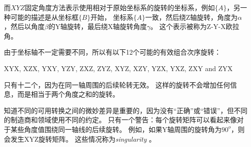
而$ XYZ $固定角度方法表示使用相对于原始坐标系的旋转的坐标系，例如$ \{A \} $，另一种可能的描述是从坐标框$ \{B \} $开始， 坐标系$ \{A \} $一致，然后绕Z轴旋转，角度为$ \alpha $，然后以角度$ \beta $的Y轴旋转，最后绕X轴旋转角度$ \gamma $。 这个表示被称为Z-Y-X欧拉角。


由于坐标轴不一定需要不同，所以有以下12个可能的有效组合次序旋转：

\begin{center}
XYX, XZX, YXY, YZY, ZXZ, ZYZ, XYZ, XZY, YZX, YXZ, ZXY and ZYX
\end{center}

只有十二个，因为在同一轴周围的后续轮转无效。 这样的旋转不会增加任何信息，而是相当于两个角度之和的旋转。


知道不同的可用转换之间的微妙差异是重要的，因为没有“正确”或“错误”，但不同的制造商和领域使用不同的约定。 只有一个警告：每个旋转矩阵可以看起来像对于某些角度值围绕同一轴线的后续旋转。 例如，如果Y轴周围的旋转角为$ 90 ^ o $，则会发生XYZ旋转矩阵。 这些情况称为\emph {singularity} 。


